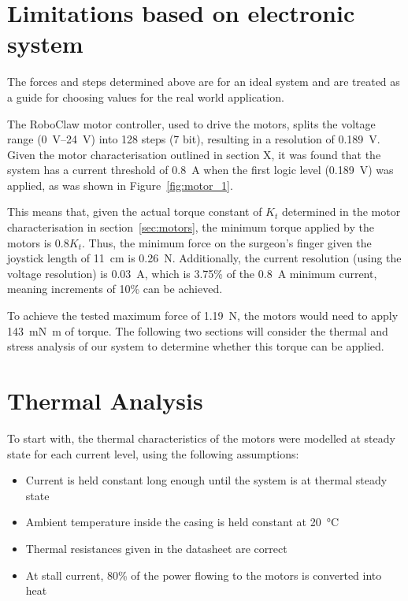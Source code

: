 
\section{Limitations based on electronic system} %
\label{sec:limitations_based_on_electronic_system}

The forces and steps determined above are for an ideal system and are treated as a guide for choosing values for the real world application.

The RoboClaw motor controller, used to drive the motors, splits the voltage range (\SIrange{0}{24}{\volt}) into 128 steps (7 bit), resulting in a resolution of \SI{0.189}{\volt}.
Given the motor characterisation outlined in section X, it was found that the system has a current threshold of \SI{0.8}{\ampere} when the first logic level (\SI{0.189}{\volt}) was applied, as was shown in Figure~\ref{fig:motor_1}.

This means that, given the actual torque constant of $K_t$ determined in the motor characterisation in section~\ref{sec:motors}, the minimum torque applied by the motors is $0.8 K_t$. Thus, the minimum force on the surgeon's finger given the joystick length of \SI{11}{\centi\metre} is \SI{0.26}{\newton}.
Additionally, the current resolution (using the voltage resolution) is \SI{0.03}{\ampere}, which is 3.75\% of the \SI{0.8}{\ampere} minimum current, meaning increments of 10\% can be achieved.

To achieve the tested maximum force of \SI{1.19}{\newton}, the motors would need to apply \SI{143}{\milli\newton\metre} of torque. The following two sections will consider the thermal and stress analysis of our system to determine whether this torque can be applied.



\section{Thermal Analysis} %
\label{sec:thermal_analysis}

To start with, the thermal characteristics of the motors were modelled at steady state for each current level, using the following assumptions:

\begin{itemize}
  \item Current is held constant long enough until the system is at thermal steady state
  \item Ambient temperature inside the casing is held constant at \SI{20}{\celsius}
  \item Thermal resistances given in the datasheet are correct
  \item At stall current, 80\% of the power flowing to the motors is converted into heat
\end{itemize}

